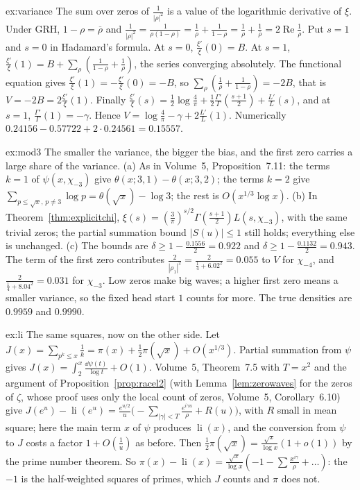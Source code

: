 \begin{solution}{ex:variance}
\idea The sum over zeros of $\frac1{|\rho|^2}$ is a value of the logarithmic derivative of $\xi$.
\writeup Under GRH, $1-\rho=\overline\rho$ and $\frac1{|\rho|^2}=\frac1{\rho(1-\rho)}=\frac1\rho+\frac1{1-\rho}=\frac1\rho+\frac1{\overline\rho}=2\operatorname{Re}\frac1\rho$. Put $s=1$ and $s=0$ in Hadamard's formula. At $s=0$, $\frac{\xi'}\xi(0)=B$. At $s=1$, $\frac{\xi'}\xi(1)=B+\sum_\rho(\frac1{1-\rho}+\frac1\rho)$, the series converging absolutely. The functional equation gives $\frac{\xi'}\xi(1)=-\frac{\xi'}\xi(0)=-B$, so $\sum_\rho(\frac1\rho+\frac1{1-\rho})=-2B$, that is $V=-2B=2\frac{\xi'}\xi(1)$. Finally $\frac{\xi'}\xi(s)=\frac12\log\frac4\pi+\frac12\frac{\Gamma'}\Gamma(\frac{s+1}2)+\frac{L'}L(s)$, and at $s=1$, $\frac{\Gamma'}\Gamma(1)=-\gamma$. Hence $V=\log\frac4\pi-\gamma+2\frac{L'}L(1)$. Numerically $0.24156-0.57722+2\cdot0.24561=0.15557$.
\end{solution}

\begin{solution}{ex:mod3}
\idea The smaller the variance, the bigger the bias, and the first zero carries a large share of the variance.
\writeup (a) As in Volume~5, Proposition~7.11: the terms $k=1$ of $\psi(x,\chi_{-3})$ give $\theta(x;3,1)-\theta(x;3,2)$; the terms $k=2$ give $\sum_{p\le\sqrt x,\,p\ne3}\log p=\theta(\sqrt x)-\log3$; the rest is $O(x^{1/3}\log x)$. (b) In Theorem~\ref{thm:explicitchi}, $\xi(s)=(\frac3\pi)^{s/2}\Gamma(\frac{s+1}2)L(s,\chi_{-3})$, with the same trivial zeros; the partial summation bound $|S(u)|\le1$ still holds; everything else is unchanged. (c) The bounds are $\delta\ge1-\frac{0.1556}2=0.922$ and $\delta\ge1-\frac{0.1132}2=0.943$. The term of the first zero contributes $\frac2{|\rho_1|^2}=\frac2{\frac14+6.02^2}=0.055$ to $V$ for $\chi_{-4}$, and $\frac2{\frac14+8.04^2}=0.031$ for $\chi_{-3}$. Low zeros make big waves; a higher first zero means a smaller variance, so the fixed head start $1$ counts for more. The true densities are $0.9959$ and $0.9990$.
\end{solution}

\begin{solution}{ex:li}
\idea The same squares, now on the other side.
\writeup Let $J(x)=\sum_{p^k\le x}\frac1k=\pi(x)+\frac12\pi(\sqrt x)+O(x^{1/3})$. Partial summation from $\psi$ gives $J(x)=\int_2^x\frac{\dd\psi(t)}{\log t}+O(1)$. Volume~5, Theorem~7.5 with $T=x^2$ and the argument of Proposition~\ref{prop:racel2} (with Lemma~\ref{lem:zerowaves} for the zeros of $\zeta$, whose proof uses only the local count of zeros, Volume~5, Corollary~6.10) give $J(e^u)-\operatorname{li}(e^u)=\frac{e^{u/2}}u\bigl(-\sum_{|\gamma|<T}\frac{e^{i\gamma u}}\rho+R(u)\bigr)$, with $R$ small in mean square; here the main term $x$ of $\psi$ produces $\operatorname{li}(x)$, and the conversion from $\psi$ to $J$ costs a factor $1+O(\frac1u)$ as before. Then $\frac12\pi(\sqrt x)=\frac{\sqrt x}{\log x}(1+o(1))$ by the prime number theorem. So $\pi(x)-\operatorname{li}(x)=\frac{\sqrt x}{\log x}(-1-\sum\frac{x^{i\gamma}}\rho+\dots)$: the $-1$ is the half-weighted squares of primes, which $J$ counts and $\pi$ does not.
\end{solution}

